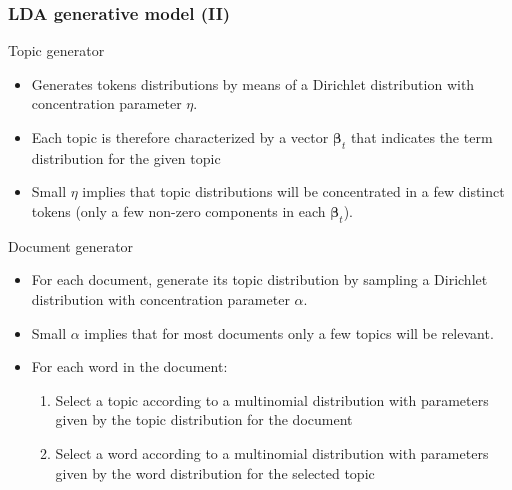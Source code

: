 \documentclass{beamer}
\begin{document}
\begin{frame}

    \frametitle{LDA generative model (II)}
    
    \footnotesize

	\begin{block}{Topic generator}
	\begin{itemize}
	\item Generates tokens distributions by means of a Dirichlet distribution with concentration parameter $\eta$.
	\item Each topic is therefore characterized by a vector $\boldsymbol{\beta}_t$ that indicates the term distribution for the given topic
	\item Small $\eta$ implies that topic distributions will be concentrated in a few distinct tokens (only a few non-zero components in each $\boldsymbol{\beta}_t$).
	\end{itemize}
	\end{block}
	\begin{block}{Document generator}
	\begin{itemize}
	\item For each document, generate its topic distribution by sampling a Dirichlet distribution with concentration parameter $\alpha$.
	\item Small $\alpha$ implies that for most documents only a few topics will be relevant.
	\item For each word in the document:
	\begin{enumerate}
	\footnotesize
		\item Select a topic according to a multinomial distribution with parameters given by the topic distribution for the document
		\item Select a word according to a multinomial distribution with parameters given by the word distribution for the selected topic
	\end{enumerate}

	\end{itemize}

	\end{block}

\end{frame}
\end{document}
